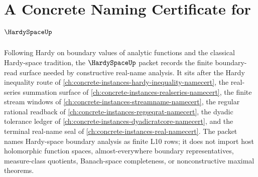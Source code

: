 \chapter{A Concrete Naming Certificate for $\HardySpaceUp$}
\label{ch:concrete-instances-hardy-space-namecert}

Following Hardy on boundary values of analytic functions and the classical Hardy-space tradition, the $\HardySpaceUp$ packet records the finite boundary-read surface needed by constructive real-name analysis. It sits after the Hardy inequality route of \autoref{ch:concrete-instances-hardy-inequality-namecert}, the real-series summation surface of \autoref{ch:concrete-instances-realseries-namecert}, the finite stream windows of \autoref{ch:concrete-instances-streamname-namecert}, the regular rational readback of \autoref{ch:concrete-instances-regseqrat-namecert}, the dyadic tolerance ledger of \autoref{ch:concrete-instances-dyadicratcore-namecert}, and the terminal real-name seal of \autoref{ch:concrete-instances-real-namecert}. The packet names Hardy-space boundary analysis as finite L10 rows; it does not import host holomorphic function spaces, almost-everywhere boundary representatives, measure-class quotients, Banach-space completeness, or nonconstructive maximal theorems.

